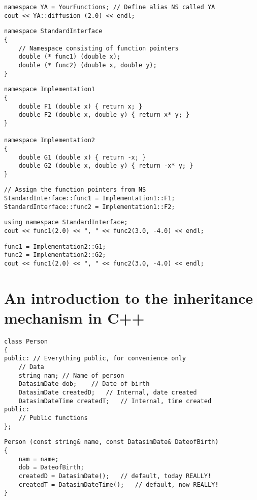 \begin{lstlisting}
namespace YA = YourFunctions; // Define alias NS called YA
cout << YA::diffusion (2.0) << endl;
\end{lstlisting}

\begin{lstlisting}
namespace StandardInterface
{
	// Namespace consisting of function pointers
	double (* func1) (double x);
	double (* func2) (double x, double y);
}
\end{lstlisting}

\begin{lstlisting}
namespace Implementation1
{
	double F1 (double x) { return x; }
	double F2 (double x, double y) { return x* y; }
}

namespace Implementation2
{
	double G1 (double x) { return -x; }
	double G2 (double x, double y) { return -x* y; }
}
\end{lstlisting}

\begin{lstlisting}
// Assign the function pointers from NS
StandardInterface::func1 = Implementation1::F1;
StandardInterface::func2 = Implementation1::F2;
\end{lstlisting}

\begin{lstlisting}
using namespace StandardInterface;
cout << func1(2.0) << ", " << func2(3.0, -4.0) << endl;
\end{lstlisting}

\begin{lstlisting}
func1 = Implementation2::G1;
func2 = Implementation2::G2;
cout << func1(2.0) << ", " << func2(3.0, -4.0) << endl;
\end{lstlisting}

\section{An introduction to the inheritance mechanism in C++}

\begin{lstlisting}
class Person
{
public: // Everything public, for convenience only
	// Data
	string nam;	// Name of person
	DatasimDate dob;	// Date of birth
	DatasimDate createdD;	// Internal, date created
	DatasimDateTime createdT;	// Internal, time created
public:
	// Public functions
};
\end{lstlisting}

\begin{lstlisting}
Person (const string& name, const DatasimDate& DateofBirth)
{
	nam = name;
	dob = DateofBirth;
	createdD = DatasimDate();	// default, today REALLY!
	createdT = DatasimDateTime();	// default, now REALLY!
}
\end{lstlisting}

